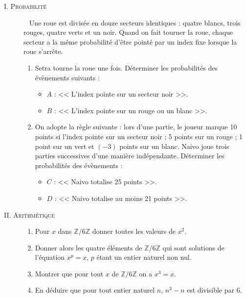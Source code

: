       \begin{description}
            \item[I. \textsc{Probabilit\'e}] ~\newline
                  Une roue est divis\'ee en douze secteurs identiques : quatre blancs, trois rouges, quatre verts et un noir.
                  Quand on fait tourner la roue, chaque secteur a la m\^eme probabilit\'e d'\^etre point\'e par un index
                  fixe lorsque la roue s'arr\^ete.
                  \begin{enumerate}
                        \item Setra tourne la roue une fois. 
                              D\'eterminer les probabilit\'es des \'ev\`enements suivants :
                              \begin{itemize}
                                    \item $A$ : << L'index pointe sur un secteur noir >>.
                                    \item $B$ : << L'index pointe sur un rouge ou un blanc >>.
                              \end{itemize}
                        \item On adopte la r\`egle suivante : lors d'une partie, 
                              le joueur marque 10 points si l'index pointe sur un secteur noir ; 
                              5 points sur un rouge ; 1 point sur un vert et $(-3)$ points sur un blanc.
                              Naivo joue trois parties successives d'une mani\`ere ind\'ependante.
                              D\'eterminer les probabilit\'es des \'ev\`enements : 
                              \begin{itemize}
                                    \item $C$ : << Naivo totalise 25 points >>.
                                    \item $D$ : << Naivo totalise au moins 21 points >>.
                              \end{itemize}
                  \end{enumerate}
            \item[II. \textsc{Arithm\'etique}]
                  \begin{enumerate}
                        \item Pour $x$ dans $\mathbb{Z}/6\mathbb{Z}$ donner toutes les valeurs de $x^2$.
                        \item Donner alors les quatre \'el\'ements de $\mathbb{Z}/6\mathbb{Z}$ qui sont solutions de
                              l'\'equation $x^p = x$, $p$ \'etant un entier naturel non nul.
                        \item Montrer que pour tout $x$ de $\mathbb{Z}/6\mathbb{Z}$ on a $x^3 = x$.
                        \item En d\'eduire que pour tout entier naturel $n$, $n^3 - n$ est divisible par $6$.
                  \end{enumerate}
      \end{description}
